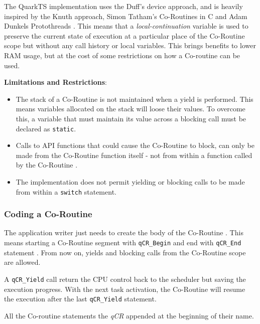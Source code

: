 
    
The QuarkTS implementation uses the Duff's device approach, and is heavily inspired by the Knuth approach\cite{knuth}, Simon Tatham's Co-Routines in C \cite{tatham} and Adam Dunkels Protothreads \cite{dunkels}. This means that a \textit{local-continuation} variable is used to preserve the current state of execution at a particular place of the Co-Routine scope but without any call history or local variables. This brings benefits to lower RAM usage, but at the cost of some restrictions on how a Co-routine can be used.
\medskip

\textbf{Limitations and Restrictions}:

\begin{itemize}
    \item The stack of a Co-Routine  is not maintained when a yield is performed. This means variables allocated on the stack will loose their values. To overcome this, a variable that must maintain its value across a blocking call must be declared as \lstinline{static}.
    \item Calls to API functions that could cause the Co-Routine to block, can only be made from the Co-Routine  function itself - not from within a function called by the Co-Routine .
    \item The implementation does not permit yielding or blocking calls to be made from within a \lstinline{switch} statement.
\end{itemize}

\subsubsection{Coding a Co-Routine}
The application writer just needs to create the body of the Co-Routine . This means starting a Co-Routine segment with \lstinline{qCR_Begin}  and end with \lstinline{qCR_End} statement . From now on, yields and blocking calls from the Co-Routine scope are allowed.
\medskip

  

A \lstinline{qCR_Yield}  call return the CPU control back to the scheduler but saving the execution progress. With the next task activation, the Co-Routine will resume the execution after the last \lstinline{qCR_Yield} statement.
\medskip

\begin{tcolorbox}
\HandRight All the Co-routine statements the \textit{qCR} appended at the beginning of their name.
\end{tcolorbox}

